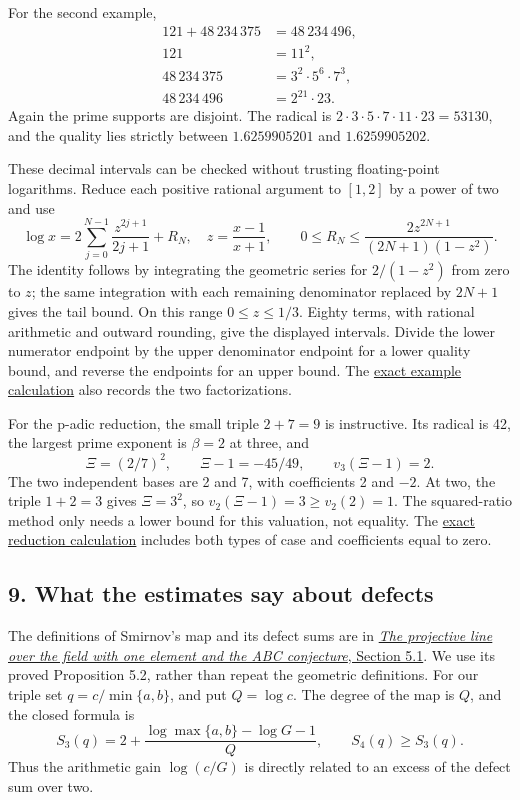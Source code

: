 \documentclass[
  11pt,
  a4paper,
]{article}
\begin{document}
For the second example, \[
 \begin{aligned}
 121+48\,234\,375&=48\,234\,496,\\
 121&=11^2,\\
 48\,234\,375&=3^2\cdot5^6\cdot7^3,\\
 48\,234\,496&=2^{21}\cdot23.
 \end{aligned}
 \tag{19.30}
\] Again the prime supports are disjoint. The radical is
\(2\cdot3\cdot5\cdot7\cdot11\cdot23=53130\), and the quality lies
strictly between \(1.6259905201\) and \(1.6259905202\).

These decimal intervals can be checked without trusting floating-point
logarithms. Reduce each positive rational argument to \([1,2]\) by a
power of two and use \[
 \log x=2\sum_{j=0}^{N-1}\frac{z^{2j+1}}{2j+1}+R_N,
 \quad z=\frac{x-1}{x+1},\qquad
 0\le R_N\le\frac{2z^{2N+1}}{(2N+1)(1-z^2)}.
 \tag{19.31}
\] The identity follows by integrating the geometric series for
\(2/(1-z^2)\) from zero to \(z\); the same integration with each
remaining denominator replaced by \(2N+1\) gives the tail bound. On this
range \(0\le z\le1/3\). Eighty terms, with rational arithmetic and
outward rounding, give the displayed intervals. Divide the lower
numerator endpoint by the upper denominator endpoint for a lower quality
bound, and reverse the endpoints for an upper bound. The
\href{https://kokunoyumeto.github.io/open-math-courses-public/courses/TR-BAKER/verification/abc-construction-check.py}{exact example
calculation} also records the two factorizations.

For the p-adic reduction, the small triple \(2+7=9\) is instructive. Its
radical is 42, the largest prime exponent is \(\beta=2\) at three, and
\[
 \Xi=(2/7)^2,\qquad\Xi-1=-45/49,\qquad
 v_3(\Xi-1)=2.
\] The two independent bases are 2 and 7, with coefficients 2 and
\(-2\). At two, the triple \(1+2=3\) gives \(\Xi=3^2\), so
\(v_2(\Xi-1)=3\ge v_2(2)=1\). The squared-ratio method only needs a
lower bound for this valuation, not equality. The
\href{https://kokunoyumeto.github.io/open-math-courses-public/courses/TR-BAKER/verification/abc-upper-check.py}{exact reduction calculation}
includes both types of case and coefficients equal to zero.

\subsection{9. What the estimates say about
defects}\label{what-the-estimates-say-about-defects}

The definitions of Smirnov's map and its defect sums are in
\href{https://kokunoyumeto.github.io/open-math-courses-public/courses/the-field-with-one-element/the-projective-line-over-f-1-and-the-abc-conjecture.html\#section-5.1}{\emph{The
projective line over the field with one element and the ABC conjecture},
Section 5.1}. We use its proved Proposition 5.2, rather than repeat the
geometric definitions. For our triple set \(q=c/\min\{a,b\}\), and put
\(Q=\log c\). The degree of the map is \(Q\), and the closed formula is
\[
 S_3(q)=2+\frac{\log\max\{a,b\}-\log G-1}{Q},
 \qquad S_4(q)\ge S_3(q).
 \tag{19.32}
\] Thus the arithmetic gain \(\log(c/G)\) is directly related to an
excess of the defect sum over two.
\end{document}
